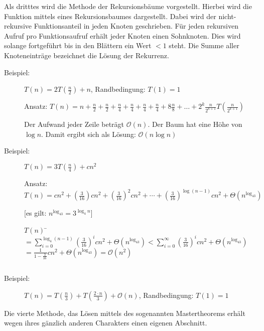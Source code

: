 \documentclass[ngerman,draft,parskip=half*,twoside]{scrreprt}
\theoremstyle{break}
\theoremstyle{nonumberbreak}
\newcommand*{\OO}{\mathcal{O}}      %
\begin{document}
Als dritttes wird die Methode der Rekursionsbäume vorgestellt.
Hierbei wird die Funktion mittels eines Rekursionsbaumes dargestellt. Dabei wird der nicht-rekursive Funktionsanteil in jeden Knoten
geschrieben. Für jeden rekursiven Aufruf pro Funktionsaufruf erhält jeder Knoten einen Sohnknoten. Dies wird solange fortgeführt bis
in den Blättern ein Wert $< 1$ steht. Die Summe aller Knoteneinträge bezeichnet die Lösung der Rekurrenz.
	\begin{description}
		\item [Beispiel:] $T(n) = 2 T\left(\frac{n}{2}\right) + n$, Randbedingung: $T(1)=1$
			
		Ansatz: $T(n) = n + \frac{n}{2} + \frac{n}{2} + \frac{n}{4} + \frac{n}{4} + \frac{n}{4} + \frac{n}{4} + 8 \frac{n}{8} + 
		\ldots + {2^k} \frac{n}{2^{k+1}} T\left(\frac{n}{2^{k+1}}\right)$
			
		
			
		Der Aufwand jeder Zeile beträgt $\OO(n)$. Der Baum hat eine Höhe von $\log n$. Damit ergibt sich als Lösung: 
		$\OO(n \log n)$			
		
		\item [Beispiel:] $T(n) = 3 T(\frac{n}{4}) + c n^2$
						
		Ansatz: $T(n) = c n^2 + \left(\frac{3}{16} \right) c n^2 + \left(\frac{3}{16}\right)^2 c n^2 + \cdots +
		\left(\frac{3}{16}\right)^{\log \left(n-1\right)} c n^2 + \Theta\left(n^{\log_43}\right)$
			
		[es gilt: $n^{\log_43}=3^{\log_4n}$]
			\begin{tabbing}
				$T(n)$ \= $= \sum_{i=0}^{\log_4\left(n-1\right)}\left(\frac{3}{16}\right)^i c n^2+ \Theta\left(n^{\log_43}\right) 
				< \sum_{i=0}^{\infty}\left(\frac{3}{16}\right)^i c n^2 + \Theta(n^{\log_43})$\\
				\> $= \frac{1}{1-\frac{3}{16}} c n^2 + \Theta(n^{\log_43})=\OO(n^2)$
			\end{tabbing}			
		$  $
	\end{description}
		
\begin{description}
	\item [Beispiel:] $T(n) = T\left(\frac{n}{3}\right) + T\left(\frac{2\cdot n}{3}\right) + \OO(n)$, Randbedingung: $T(1)=1$
	$  $
	\end{description}		
%
Die vierte Methode, das Lösen mittels des sogenannten Mastertheorems erhält wegen ihres gänzlich anderen Charakters einen eigenen
Abschnitt.
%
\end{document}

